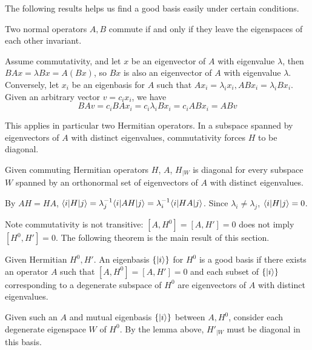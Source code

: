 The following results helps us find a good basis easily under certain conditions. 
\begin{theorem}
    Two normal operators $A, B$ commute if and only if they leave the eigenspaces of 
    each other invariant. 

    \prf Assume commutativity, and let $x$ be an eigenvector of $A$ with eigenvalue $\lambda$, 
    then $BAx = \lambda Bx = A(Bx)$, so $Bx$ is also an eigenvector of $A$ with eigenvalue 
    $\lambda$. 
    Conversely, let $x_i$ be an eigenbasis for $A$ such that $Ax_i = \lambda_i x_i, ABx_i = \lambda_i Bx_i$.
    Given an arbitrary vector $v=c_ix_i$, we have 
    \[ 
        BAv = c_i BAx_i = c_i\lambda_i Bx_i = c_i ABx_i = ABv 
    \] 
\end{theorem}
This applies in particular two Hermitian operators. 
In a subspace spanned by eigenvectors of $A$ with distinct eigenvalues, 
commutativity forces $H$ to be diagonal. 
\begin{lemma}
    Given commuting Hermitian operators \( H \), \( A \), 
    $H_{|W}$ is diagonal for every subspace $W$ spanned by an orthonormal set 
    of eigenvectors of $A$ with distinct eigenvalues. 

    \prf By $AH=HA$, $\langle i|H|j\rangle= \lambda_j^{-1}\langle i|AH|j\rangle= \lambda_i^{-1}\langle i|HA|j\rangle$. 
    Since $\lambda_i\neq \lambda_j$, $\langle i|H|j\rangle= 0$.
\end{lemma} 
Note commutativity is not transitive: $[A, H^0] = [A, H']=0$ does not imply $[H^0, H']=0$.
The following theorem is the main result of this section. 
\begin{theorem}
    Given Hermitian \( H^0, H'\). An eigenbasis $\{|i\rangle\}$ for $H^0$ 
    is a good basis if there exists an operator $A$ such that 
    $[A, H^0] = [A, H']=0$ and each subset of $\{|i\rangle\}$ corresponding 
    to a degenerate subspace of $H^0$ are eigenvectors of $A$ with distinct eigenvalues. 

    \prf Given such an $A$ and mutual eigenbasis $\{|i\rangle\}$ between $A, H^0$, 
    consider each degenerate eigenspace $W$ of $H^0$. By the lemma above, $H'_{|W}$ must 
    be diagonal in this basis. 
\end{theorem}
